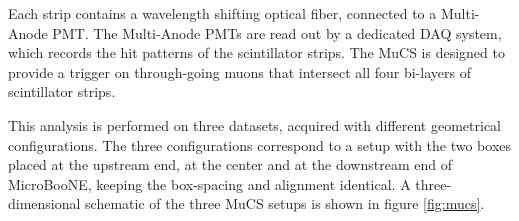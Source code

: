 \documentclass[a4paper,11pt]{article}
\begin{document}
Each strip contains a wavelength shifting optical fiber, connected to a Multi-Anode PMT. The Multi-Anode PMTs are read out by a dedicated DAQ system, which records the hit patterns of the scintillator strips.
The MuCS is designed to provide a trigger on through-going muons that intersect all four bi-layers of scintillator strips.

This analysis is performed on three datasets, acquired with different geometrical configurations. The three configurations correspond to a setup with the two boxes placed at the upstream end, at the center and at the downstream end of MicroBooNE, keeping the box-spacing and alignment identical.
A three-dimensional schematic of the three MuCS setups is shown in figure \ref{fig:mucs}.
\end{document}
